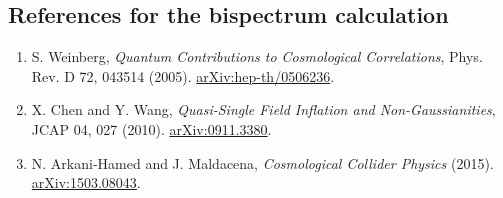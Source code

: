 \subsection*{References for the bispectrum calculation}
\begin{enumerate}\small\setlength{\itemsep}{1pt}
\item S. Weinberg, \emph{Quantum Contributions to Cosmological Correlations}, Phys. Rev. D 72, 043514 (2005). \href{https://arxiv.org/abs/hep-th/0506236}{arXiv:hep-th/0506236}.
\item X. Chen and Y. Wang, \emph{Quasi-Single Field Inflation and Non-Gaussianities}, JCAP 04, 027 (2010). \href{https://arxiv.org/abs/0911.3380}{arXiv:0911.3380}.
\item N. Arkani-Hamed and J. Maldacena, \emph{Cosmological Collider Physics} (2015). \href{https://arxiv.org/abs/1503.08043}{arXiv:1503.08043}.
\end{enumerate}
